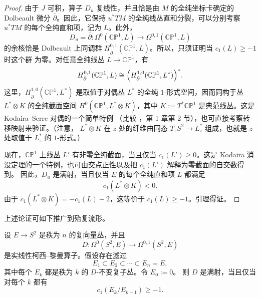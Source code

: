 \begin{proof}
由于 $J$ 可积，算子 $D_u$ 复线性，并且恰是由 $M$ 的全纯坐标卡确定的 Dolbeault 微分
$\bar\partial$。因此，它保持 $u^*TM$ 的全纯线丛直和分裂，可以分别考察
$u^*TM$ 的每个全纯直和项，记为 $L$。此外，
\[
  D_u=\bar\partial:
  \Omega^0(\mathbb{CP}^1,L)
  \longrightarrow\Omega^{0,1}(\mathbb{CP}^1,L)
\]
的余核恰是 Dolbeault 上同调群
$H_{\bar\partial}^{0,1}(\mathbb{CP}^1,L)$。所以，只须证明当 $c_1(L)\ge-1$ 时这个群
为零。对任意全纯线丛 $L\to\mathbb{CP}^1$，有
\[
  H_{\bar\partial}^{0,1}(\mathbb{CP}^1,L)
  \cong
  \Bigl(H_{\bar\partial}^{1,0}(\mathbb{CP}^1,L^*)\Bigr)^*.
\]
这里，$H_{\bar\partial}^{1,0}(\mathbb{CP}^1,L^*)$ 是取值于对偶丛 $L^*$ 的全纯
$1$-形式空间，因而同构于丛 $L^*\otimes K$ 的全纯截面空间
$H^0(\mathbb{CP}^1,L^*\otimes K)$，其中
$K:=T^*\mathbb{CP}^1$ 是典范线丛。这是 Kodaira--Serre 对偶的一个简单特例
（比较 ，第 1 章第 2 节），也可直接考察转移映射来验证。（注意，
$L^*\otimes K$ 在 $z$ 处的纤维由同态 $T_zS^2\to L_z^*$ 组成，也就是 $z$ 处取值于
$L_z^*$ 的 $1$-形式。）

现在，$\mathbb{CP}^1$ 上线丛 $L'$ 有非零全纯截面，当且仅当 $c_1(L')\ge0$。这是
Kodaira 消没定理的一个特例，也可由交点正性以及把 $c_1(L')$ 解释为零截面的自交数得到。
因此，$D_u$ 是满射，当且仅当 $E$ 的每个全纯直和项 $L$ 都满足
\[
  c_1(L^*\otimes K)<0.
\]
由于 $c_1(L^*\otimes K)=-c_1(L)-2$，这等价于 $c_1(L)\ge-1$。引理得证。
\end{proof}

上述论证可如下推广到殆复流形。

\begin{lemma}\label{lem:3-3-2}
设 $E\to S^2$ 是秩为 $n$ 的复向量丛，并且
\[
  D:\Omega^0(S^2,E)\longrightarrow\Omega^{0,1}(S^2,E)
\]
是实线性柯西--黎曼算子。假设存在滤过
\[
  E_1\subset E_2\subset\cdots\subset E_n=E,
\]
其中每个 $E_k$ 都是秩为 $k$ 的 $D$-不变复子丛。令 $E_0:=0$。
则 $D$ 是满射，当且仅当对每个 $k$ 都有
\[
  c_1(E_k/E_{k-1})\ge-1.
\]
\end{lemma}

